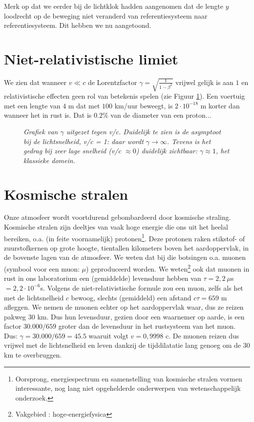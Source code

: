 Merk op dat we eerder bij de lichtklok hadden aangenomen dat de
lengte $y$ loodrecht op de beweging niet veranderd van
referentiesysteem naar referentiesysteem. Dit hebben we nu aangetoond.

\section{Niet-relativistische limiet}
We zien dat wanneer $v \ll c$ de Lorentzfactor 
$\gamma = \sqrt{\frac{1}{1-\beta^2}}$ vrijwel gelijk is 
aan $1$ en relativistische effecten geen rol van betekenis spelen (zie Figuur \ref{fig:gammagraf}).
Een voertuig met een lengte van $4$ m dat met $100$ km/uur beweegt, is
$2\cdot 10^{-18}$ m korter dan  wanneer het in rust is.
Dat is $0.2 \%$  van de diameter van een proton...

\begin{figure}[t]
	\centering
	\caption{{\sl Grafiek van $\gamma$ uitgezet tegen v/c. Duidelijk te zien is de asymptoot bij de lichtsnelheid, v/c = 1: daar wordt $\gamma \rightarrow \infty$. Tevens is het gedrag bij zeer lage snelheid (v/c $\approx 0$) duidelijk zichtbaar: $\gamma \approx 1$, het klassieke domein.}}
	\label{fig:gammagraf}
\end{figure}


\section{Kosmische stralen}
Onze atmosfeer wordt voortdurend gebombardeerd door kosmische straling.
Kosmische stralen zijn deeltjes van vaak hoge energie die ons uit het heelal 
bereiken, o.a. (in feite voornamelijk) protonen\footnote{Oorsprong, energiespectrum en samenstelling van kosmische stralen 
vormen interessante, nog lang niet opgehelderde onderwerpen van 
wetenschappelijk onderzoek.}. Deze protonen raken stikstof- of zuurstofkernen op grote hoogte, tientallen 
kilometers boven het aardoppervlak, in de bovenste lagen van de atmosfeer. We weten dat bij die botsingen o.a. muonen (symbool voor een muon: $\mu$)
geproduceerd worden. We weten\footnote{Vakgebied : hoge-energiefysica}
ook dat muonen in rust in ons laboratorium een (gemiddelde) levensduur 
hebben van $\tau = 2,2\ \mu$s $= 2,2\cdot  10^{-6}$s.
Volgens de niet-relativistische formule zou een muon, zelfs als het met de 
lichtsnelheid $c$ bewoog, slechts (gemiddeld) een 
afstand $c\tau = 659$ m afleggen.
We nemen de muonen echter op het aardoppervlak waar, dus ze reizen 
pakweg $30$ km.
Dus hun levensduur, gezien door een waarnemer op aarde, is een factor 
$30.000/659$ groter dan de levensduur in het rustsysteem van het muon.
Dus: $\gamma = 30.000/659 = 45.5$ waaruit volgt $v = 0,9998$ c.
De muonen reizen dus vrijwel met de lichtsnelheid en leven dankzij de 
tijddilatatie lang genoeg om de $30$ km te overbruggen.


